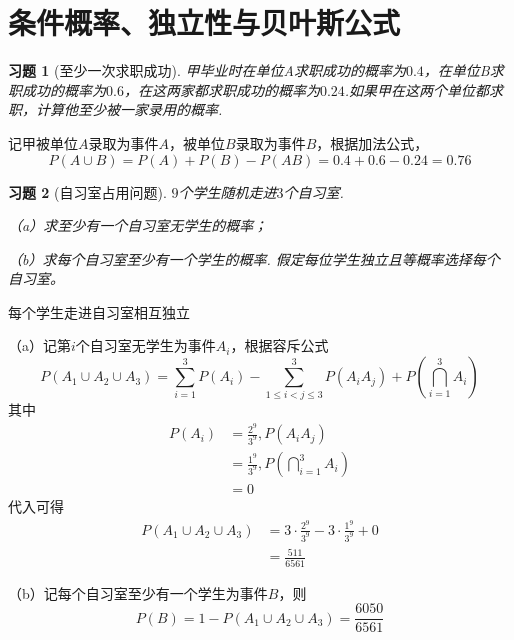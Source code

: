 \documentclass[12pt,fontset=fandol]{ctexart}
\newtheorem{exercise}{习题}[section]
\begin{document}
\clearpage\section{条件概率、独立性与贝叶斯公式}

\begin{exercise}[至少一次求职成功]\label{q:Y2.1}
甲毕业时在单位A求职成功的概率为$0.4$，在单位B求职成功的概率为$0.6$，在这两家都求职成功的概率为$0.24$.如果甲在这两个单位都求职，计算他至少被一家录用的概率.\par{}
\end{exercise}

\begin{solve}\label{a:Y2.1}
记甲被单位$A$录取为事件$A$，被单位$B$录取为事件$B$，根据加法公式，
\[P(A \cup B) = P(A) + P(B) - P(AB) = 0.4 + 0.6 - 0.24 = 0.76\]
\end{solve}

\begin{exercise}[自习室占用问题]\label{q:Y2.2}
$9$个学生随机走进$3$个自习室.

（a）求至少有一个自习室无学生的概率；

（b）求每个自习室至少有一个学生的概率. 假定每位学生独立且等概率选择每个自习室。\par{}
\end{exercise}

\begin{solve}\label{a:Y2.2}
每个学生走进自习室相互独立

（a）记第$i$个自习室无学生为事件$A_i$，根据容斥公式
\[P({A_1} \cup {A_2} \cup {A_3}) = \sum\limits_{i = 1}^3 {P({A_i})}  - \sum\limits_{1 \leqslant i < j \leqslant 3}^3 {P({A_i}{A_j})}  + P(\bigcap\limits_{i = 1}^3 {{A_i}} )\]
其中
\[\begin{aligned}P({A_i}) &= \frac{{{2^9}}}{{{3^9}}},P({A_i}{A_j}) \\&= \frac{{{1^9}}}{{{3^9}}},P(\bigcap\limits_{i = 1}^3 {{A_i}} ) \\&= 0\end{aligned}\]
代入可得
\[\begin{aligned}P({A_1} \cup {A_2} \cup {A_3}) &= 3 \cdot \frac{{{2^9}}}{{{3^9}}} - 3 \cdot \frac{{{1^9}}}{{{3^9}}} + 0 \\&= \frac{{511}}{{6561}}\end{aligned}\]

（b）记每个自习室至少有一个学生为事件$B$，则
\[P(B) = 1 - P({A_1} \cup {A_2} \cup {A_3}) = \frac{{6050}}{{6561}}\]
\end{solve}
\end{document}
